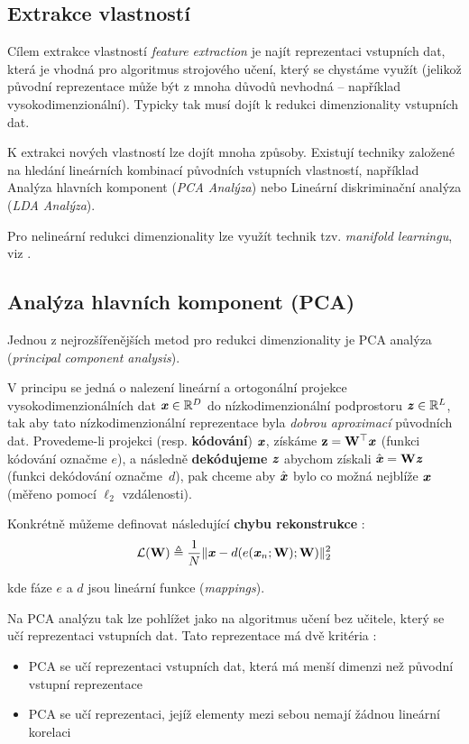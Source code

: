 \subsection{Extrakce vlastností}
\label{sec:feature_extraction}
Cílem extrakce vlastností \emph{feature extraction} je najít reprezentaci vstupních dat, která je vhodná pro algoritmus strojového učení, který se chystáme využít (jelikož původní reprezentace může být z mnoha důvodů nevhodná – například vysokodimenzionální).
Typicky tak musí dojít k redukci dimenzionality vstupních dat. \cite{Liu1998}

K extrakci nových vlastností lze dojít mnoha způsoby.
Existují techniky založené na hledání lineárních kombinací původních vstupních vlastností, například Analýza hlavních komponent (\emph{PCA Analýza}) nebo Lineární diskriminační analýza (\emph{LDA Analýza}).

Pro nelineární redukci dimenzionality lze využít technik tzv. \emph{manifold learningu}, viz \cite[kap. 5.11.3.]{Goodfellow2016}. 


\subsection{Analýza hlavních komponent (PCA)}
\label{sec:pca}
Jednou z nejrozšířenějších metod pro redukci dimenzionality je PCA analýza (\emph{principal component analysis}).

V principu se jedná o nalezení lineární a ortogonální projekce vysokodimenzionálních dat $\textbf{\emph{x}} \in \mathbb{R}^D$ do nízkodimenzionální podprostoru  $\textbf{\emph{z}} \in \mathbb{R}^L$,
tak aby tato nízkodimenzionální reprezentace byla \emph{dobrou aproximací} původních dat.
Provedeme-li projekci (resp. \textbf{kódování}) $\textbf{\emph{x}}$, získáme $\mathbf{z} = \mathbf{W^{\top}} \textbf{\emph{x}}$ (funkci kódování označme $e$),
a následně \textbf{dekódujeme} $\textbf{\emph{z}}$ abychom získali $\hat{\textbf{\emph{x}}} = \mathbf{W}\textbf{\emph{z}}$ (funkci dekódování označme $d$),
pak chceme aby $\hat{\textbf{\emph{x}}}$ bylo co možná nejblíže $\textbf{\emph{x}}$ (měřeno pomocí $\ell_2$ vzdálenosti). \cite{Murphy2022}

Konkrétně můžeme definovat následující \textbf{chybu rekonstrukce} \cite{Murphy2022}:
\begin{equation}
    \mathcal{L}(\mathbf{W}) \triangleq \frac{1}{N} \| \textbf{\emph{x}} - d(e(\textbf{\emph{x}}_n; \mathbf{W}); \mathbf{W})\|^2_2
\end{equation}

kde fáze $e$ a $d$ jsou lineární funkce (\emph{mappings}).

Na PCA analýzu tak lze pohlížet jako na algoritmus učení bez učitele, který se učí reprezentaci vstupních dat. Tato reprezentace má dvě kritéria \cite{Goodfellow2016}:

\begin{itemize}
    \item PCA se učí reprezentaci vstupních dat, která má menší dimenzi než původní vstupní reprezentace
    \item PCA se učí reprezentaci, jejíž elementy mezi sebou nemají žádnou lineární korelaci
\end{itemize}
